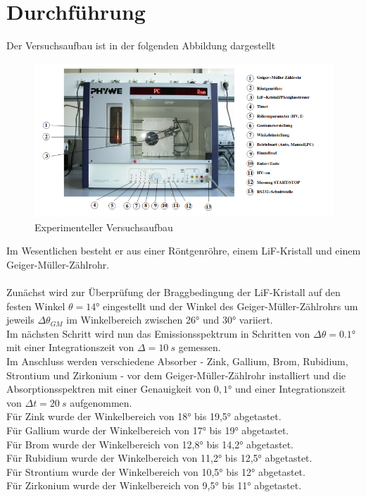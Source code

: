 \section{Durchführung}
\label{sec:Durchführung}

Der Versuchsaufbau ist in der folgenden Abbildung dargestellt
\begin{figure}
    \centering
    \includegraphics{Röntgenröhre.png}
    \caption{Experimenteller Versuchsaufbau \cite{anleitung}}
    \label{fig:hex}
  \end{figure}
Im Wesentlichen besteht er aus einer Röntgenröhre, einem LiF-Kristall und einem 
Geiger-Müller-Zählrohr. 
\\
\\
Zunächst wird zur Überprüfung der Braggbedingung der LiF-Kristall auf den festen Winkel 
$\theta = 14°$ eingestellt und der Winkel des Geiger-Müller-Zählrohrs um jeweils 
$\Delta \theta_{GM}$ im Winkelbereich zwischen 26° und 30° variiert.\\
Im nächsten Schritt wird nun das Emissionsspektrum in Schritten von $\Delta \theta = 0.1°$
mit einer Integrationszeit von $\Delta =10\ s$ gemessen.\\
Im Anschluss werden verschiedene Absorber - Zink, Gallium, Brom, Rubidium, Strontium und 
Zirkonium - vor dem Geiger-Müller-Zählrohr installiert und die 
Absorptionsspektren mit einer Genauigkeit von $0,1°$ und einer Integrationszeit 
von $\Delta t = 20 \ s$ aufgenommen.\\
Für Zink wurde der Winkelbereich von 18° bis 19,5° abgetastet.\\
Für Gallium wurde der Winkelbereich von 17° bis 19° abgetastet.\\
Für Brom wurde der Winkelbereich von 12,8° bis 14,2° abgetastet.\\
Für Rubidium wurde der Winkelbereich von 11,2° bis 12,5° abgetastet.\\
Für Strontium wurde der Winkelbereich von 10,5° bis 12° abgetastet.\\
Für Zirkonium wurde der Winkelbereich von 9,5° bis 11° abgetastet.\\